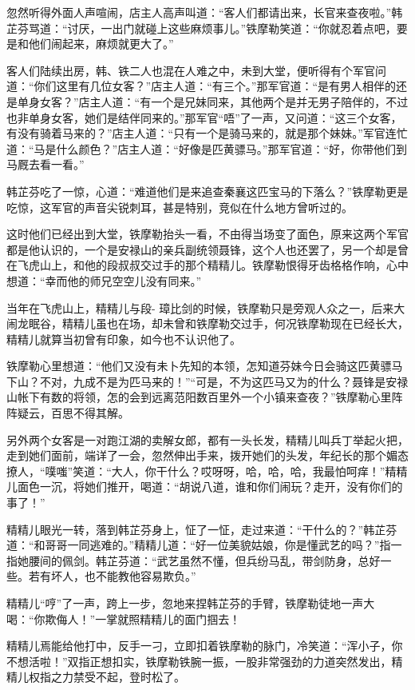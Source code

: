 \documentclass[12pt,oneside]{book}
\begin{document}
忽然听得外面人声喧闹，店主人高声叫道：``客人们都请出来，长官来查夜啦。''韩芷芬骂道：``讨厌，一出门就碰上这些麻烦事儿。''铁摩勒笑道：``你就忍着点吧，要是和他们闹起来，麻烦就更大了。''

客人们陆续出房，韩、铁二人也混在人难之中，未到大堂，便听得有个军官问道：``你们这里有几位女客？''店主人道：``有三个。''那军官道：``是有男人相伴的还是单身女客？''店主人道：``有一个是兄妹同来，其他两个是并无男子陪伴的，不过也非单身女客，她们是结伴同来的。''那军官``唔''了一声，又问道：``这三个女客，有没有骑着马来的？''店主人道：``只有一个是骑马来的，就是那个妹妹。''军官连忙道：``马是什么颜色？''店主人道：``好像是匹黄骠马。''那军官道：``好，你带他们到马厩去看一看。''

韩芷芬吃了一惊，心道：``难道他们是来追查秦襄这匹宝马的下落么？''铁摩勒更是吃惊，这军官的声音尖锐刺耳，甚是特别，竞似在什么地方曾听过的。

这时他们已经出到大堂，铁摩勒抬头一看，不由得当场变了面色，原来这两个军官都是他认识的，一个是安禄山的亲兵副统领聂锋，这个人也还罢了，另一个却是曾在飞虎山上，和他的段叔叔交过手的那个精精儿。铁摩勒恨得牙齿格格作响，心中想道：``幸而他的师兄空空儿没有同来。''

当年在飞虎山上，精精儿与段-
璋比剑的时候，铁摩勒只是旁观人众之一，后来大闹龙眠谷，精精儿虽也在场，却未曾和铁摩勒交过手，何况铁摩勒现在已经长大，精精儿就算当初曾有印象，如今也不认识他了。

铁摩勒心里想道：``他们又没有未卜先知的本领，怎知道芬妹今日会骑这匹黄骠马下山？不对，九成不是为匹马来的！''``可是，不为这匹马又为的什么？聂锋是安禄山帐下有数的将领，怎的会到远离范阳数百里外一个小镇来查夜？''铁摩勒心里阵阵疑云，百思不得其解。

另外两个女客是一对跑江湖的卖解女郎，都有一头长发，精精儿叫兵丁举起火把，走到她们面前，端详了一会，忽然伸出手来，拨开她们的头发，年纪长的那个媚态撩人，``噗嗤''笑道：``大人，你干什么？哎呀呀，哈，哈，哈，我最怕呵痒！''精精儿面色一沉，将她们推开，喝道：``胡说八道，谁和你们闹玩？走开，没有你们的事了！''

精精儿眼光一转，落到韩芷芬身上，怔了一怔，走过来道：``干什么的？''韩芷芬道：``和哥哥一同逃难的。''精精儿道：``好一位美貌姑娘，你是懂武艺的吗？''指一指她腰间的佩剑。韩芷芬道：``武艺虽然不懂，但兵纷马乱，带剑防身，总好一些。若有坏人，也不能教他容易欺负。''

精精儿``哼''了一声，跨上一步，忽地来捏韩芷芬的手臂，铁摩勒徒地一声大喝：``你欺侮人！''一掌就照精精儿的面门掴去！

精精儿焉能给他打中，反手一刁，立即扣着铁摩勒的脉门，冷笑道：``浑小子，你不想活啦！''双指正想扣实，铁摩勒铁腕一振，一股非常强劲的力道突然发出，精精儿权指之力禁受不起，登时松了。
\end{document}
